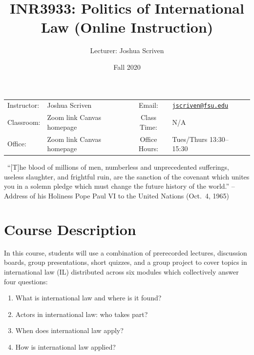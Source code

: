 \documentclass[10pt,]{article}
\title{INR3933: Politics of International Law \textbar{} (Online
Instruction)}
\author{Lecturer: Joshua Scriven}
\date{Fall 2020}
\providecommand{\tightlist}{%
  \setlength{\itemsep}{0pt}\setlength{\parskip}{0pt}}
\begin{document}
		\maketitle
	

		\thispagestyle{firststyle}

\begin{center}
\begin{tabular}{llccll}
\hline
\rowcolor{Gray}
Instructor: & Joshua Scriven &          \hspace{3cm}           &
Email: & \href{mailto:jscriven@fsu.edu}{\nolinkurl{jscriven@fsu.edu}}\\

Classroom: &  Zoom link Canvas homepage & &
Class Time: & N/A\\
Office: & Zoom link Canvas homepage & &
Office Hours: & Tues/Thurs 13:30--15:30\\
\hline
\end{tabular}

\begin{minipage}{5.2in}
  \begin{flushleft}
    {\color{Gray}{\RectangleBold}} ~{\footnotesize ``{[}T{]}he blood of
millions of men, numberless and unprecedented sufferings, useless
slaughter, and frightful ruin, are the sanction of the covenant which
unites you in a solemn pledge which must change the future history of
the world.'' --Address of his Holiness Pope Paul VI to the United
Nations (Oct.~4, 1965)}\newline
  \end{flushleft}
\end{minipage}


\end{center}

\vspace{2mm}


\hypertarget{course-description}{%
\section{Course Description}\label{course-description}}

In this course, students will use a combination of prerecorded lectures,
discussion boards, group presentations, short quizzes, and a group
project to cover topics in international law (IL) distributed across six
modules which collectively answer four questions:

\begin{enumerate}
\def\labelenumi{\arabic{enumi}.}
\tightlist
\item
  What is international law and where is it found?
\item
  Actors in international law: who takes part?
\item
  When does international law apply?
\item
  How is international law applied?
\end{enumerate}
\end{document}
